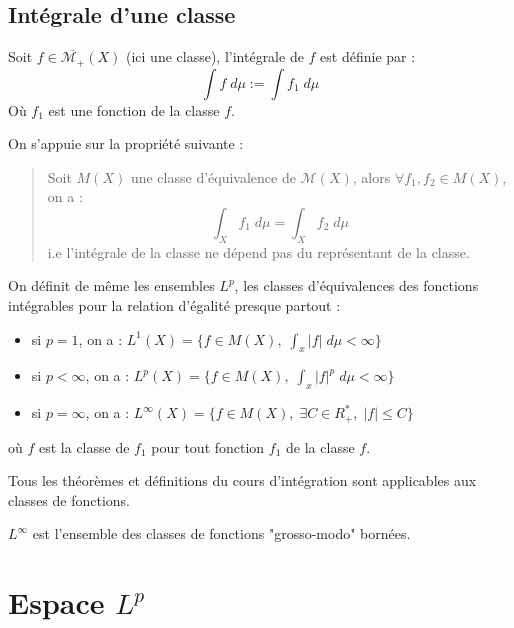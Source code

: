 \subsection{Intégrale d'une classe}

\begin{definition}
    Soit $f \in \overline{\mathcal{M}_+}(X)$ (ici une classe), l'intégrale de $f$ est définie par :
        \[ \int f \;d \mu := \int f_1 \; d \mu \] 
    Où $f_1$ est une fonction de la classe $f$. 
\end{definition}

\begin{remark}
    On s'appuie sur la propriété suivante :
    \begin{quote}
        Soit $M(X)$ une classe d'équivalence de $\mathcal{M}(X)$, alors $ \forall f_1,f_2 \in M(X)$, on a :
            \[ \int_X f_1 \; d \mu = \int_X f_2 \; d \mu \] 
        i.e l'intégrale de la classe ne dépend pas du représentant de la classe. 
    \end{quote}
\end{remark}


\begin{definition}[Espace $L^p$]
    On définit de même les ensembles $L^p$, les classes d'équivalences des fonctions intégrables pour la relation d'égalité 
    presque partout : 
    \begin{itemize}
        \item si $p=1$, on a : $ L^1(X) = \{ f \in M(X), \; \int_x |f| \; d \mu < \infty \} $
        \item si $p < \infty$, on a : $L^p(X) = \{ f \in M(X), \; \int_x |f|^p \; d \mu < \infty \}$
        \item si $p = \infty$, on a : $L^\infty(X) = \{ f \in M(X), \; \exists C \in R_+^*, \; |f| \leq C \}$
    \end{itemize}
    où $f$ est la classe de $f_1$ pour tout fonction $f_1$ de la classe $f$.
\end{definition}

\begin{theorem}[Extension]
    Tous les théorèmes et définitions du cours d'intégration sont applicables aux classes de fonctions. 
\end{theorem}

$L^\infty$ est l'ensemble des classes de fonctions "grosso-modo" bornées. 


\section{Espace $L^p$}

